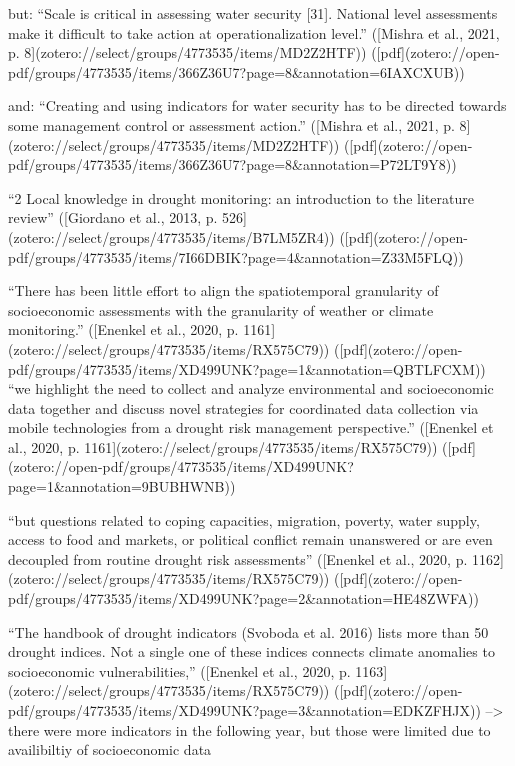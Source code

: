 but: 
“Scale is critical in assessing water security [31]. National level assessments make it difficult to take action at operationalization level.” ([Mishra et al., 2021, p. 8](zotero://select/groups/4773535/items/MD2Z2HTF)) ([pdf](zotero://open-pdf/groups/4773535/items/366Z36U7?page=8&annotation=6IAXCXUB))

and: “Creating and using indicators for water security has to be directed towards some management control or assessment action.” ([Mishra et al., 2021, p. 8](zotero://select/groups/4773535/items/MD2Z2HTF)) ([pdf](zotero://open-pdf/groups/4773535/items/366Z36U7?page=8&annotation=P72LT9Y8))


“2 Local knowledge in drought monitoring: an introduction to the literature review” ([Giordano et al., 2013, p. 526](zotero://select/groups/4773535/items/B7LM5ZR4)) ([pdf](zotero://open-pdf/groups/4773535/items/7I66DBIK?page=4&annotation=Z33M5FLQ))

“There has been little effort to align the spatiotemporal granularity of socioeconomic assessments with the granularity of weather or climate monitoring.” ([Enenkel et al., 2020, p. 1161](zotero://select/groups/4773535/items/RX575C79)) ([pdf](zotero://open-pdf/groups/4773535/items/XD499UNK?page=1&annotation=QBTLFCXM))
“we highlight the need to collect and analyze environmental and socioeconomic data together and discuss novel strategies for coordinated data collection via mobile technologies from a drought risk management perspective.” ([Enenkel et al., 2020, p. 1161](zotero://select/groups/4773535/items/RX575C79)) ([pdf](zotero://open-pdf/groups/4773535/items/XD499UNK?page=1&annotation=9BUBHWNB))

“but questions related to coping capacities, migration, poverty, water supply, access to food and markets, or political conflict remain unanswered or are even decoupled from routine drought risk assessments” ([Enenkel et al., 2020, p. 1162](zotero://select/groups/4773535/items/RX575C79)) ([pdf](zotero://open-pdf/groups/4773535/items/XD499UNK?page=2&annotation=HE48ZWFA))

“The handbook of drought indicators (Svoboda et al. 2016) lists more than 50 drought indices. Not a single one of these indices connects climate anomalies to socioeconomic vulnerabilities,” ([Enenkel et al., 2020, p. 1163](zotero://select/groups/4773535/items/RX575C79)) ([pdf](zotero://open-pdf/groups/4773535/items/XD499UNK?page=3&annotation=EDKZFHJX))
--> there were more indicators in the following year, but those were limited due to availibiltiy of socioeconomic data


